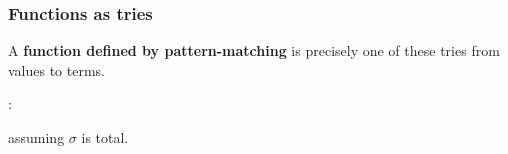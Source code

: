 \begin{frame}
\frametitle{Functions as tries}

A \textbf{function defined by pattern-matching} is precisely one of
these tries from values to terms.

\begin{smathpar}
{
   \Gamma \vdash \exFun{\sigma} : 
}
\end{smathpar}
assuming $\sigma$ is total.
\end{frame}
